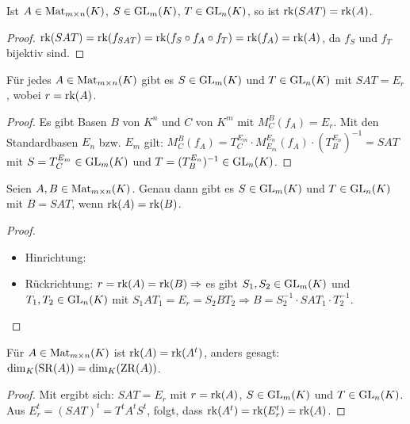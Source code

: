 \begin{lemma}
	Ist $A\in \operatorname{Mat}_{m\times n}(K)$, $S\in \operatorname{GL}_m(K)$, $T\in \operatorname{GL}_n(K)$, so ist $\operatorname{rk}(SAT)=\operatorname{rk}(A)$.
\end{lemma}
\begin{proof}
	$\operatorname{rk}(SAT)=\operatorname{rk}(f_{SAT})=\operatorname{rk}(f_S\circ f_A\circ f_T)=\operatorname{rk}(f_A)=\operatorname{rk}(A)$, da $f_S$ und $f_T$ bijektiv sind.
\end{proof}

\begin{proposition}
	Für jedes $A\in \operatorname{Mat}_{m\times n}(K)$ gibt es $S\in \operatorname{GL}_m(K)$ und $T\in \operatorname{GL}_n(K)$ mit $SAT=E_r$, wobei $r=\operatorname{rk}(A)$.
\end{proposition}
\begin{proof}
	Es gibt Basen $B$ von $K^n$ und $C$ von $K^m$ mit $M_C^B(f_A)=E_r$. Mit den Standardbasen $E_n$ bzw. $E_m$ gilt: $M_C^B(f_A)=T_C^{E_m}
	\cdot M_{E_m}^{E_n}(f_A)\cdot (T_B^{E_n})^{-1}=SAT$ mit $S=T_C^{E_m}\in \operatorname{GL}_m(K)$ und $T=(T_B^{E_n})^{-1}\in \operatorname{GL}_n(K)$.
\end{proof}

\begin{conclusion}
	Seien $A,B\in \operatorname{Mat}_{m\times n}(K)$. Genau dann gibt es $S\in \operatorname{GL}_m(K)$ und $T\in \operatorname{GL}_n(K)$ mit $B=SAT$, wenn 
	$\operatorname{rk}(A)=\operatorname{rk}(B)$.
\end{conclusion}
\begin{proof}
	\begin{itemize}
		\item Hinrichtung: 
		\item Rückrichtung: $r=\operatorname{rk}(A)=\operatorname{rk}(B)\Rightarrow$ es gibt $S_1,S_2\in \operatorname{GL}_m(K)$ und $T_1,T_2\in \operatorname{GL}_n(K)$ mit $S_1AT_1=E_r=S_2BT_2 \Rightarrow 
		B=S_2^{-1}\cdot SAT_1\cdot T_2^{-1}$.
	\end{itemize}
\end{proof}

\begin{proposition}
	Für $A\in \operatorname{Mat}_{m\times n}(K)$ ist $\operatorname{rk}(A)=\operatorname{rk}(A^t)$, anders gesagt: $\dim_K(\operatorname{SR}(A))=\dim_K(\operatorname{ZR}(A))$.
\end{proposition}
\begin{proof}
	Mit  ergibt sich: $SAT=E_r$ mit $r=\operatorname{rk}(A)$, $S\in \operatorname{GL}_m(K)$ und $T\in \operatorname{GL}_n(K)$. Aus $E_r^t=(SAT)^t=T^tA^tS^t$, folgt, 
	dass $\operatorname{rk}(A^t)=\operatorname{rk}(E_r^t)=\operatorname{rk}(A)$.
\end{proof}

